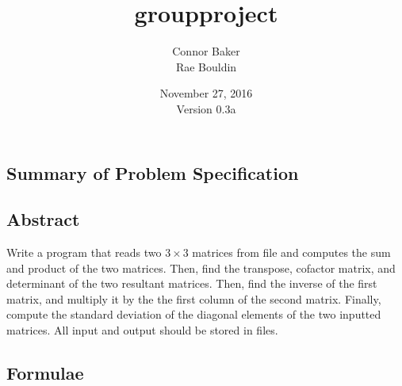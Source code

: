 \documentclass[12pt]{article}
\begin{document}
\null
\nointerlineskip 
\vfill
\let \snewpage \newpage
\let \newpage \relax
    \title{groupproject}
    \author{Connor Baker\\Rae Bouldin}
    \date{November 27, 2016\\Version 0.3a}
\maketitle
\let \newpage \snewpage
\vfill
\thispagestyle{empty}



\newpage %



\makeatletter
{}
\makeatother
\tableofcontents

\clearpage
{}

\begin{center}
\section{Summary of Problem Specification}
\end{center}
\subsection{Abstract}
Write a program that reads two $3\times3$ matrices from file and computes the sum and product of the two matrices. Then, find the transpose, cofactor matrix, and determinant of the two resultant matrices. Then, find the inverse of the first matrix, and multiply it by the the first column of the second matrix. Finally, compute the standard deviation of the diagonal elements of the two inputted matrices.
All input and output should be stored in files.



\newpage %



\begin{center}
\section{Formulae}
\end{center}
\end{document}
